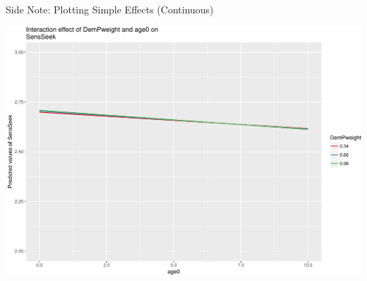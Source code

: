 \begin{frame}[fragile]{Side Note: Plotting Simple Effects (Continuous)}

\small

\begin{Shaded}
\begin{Highlighting}[]
 \NormalTok{, } \NormalTok{)}
\end{Highlighting}
\end{Shaded}

\includegraphics{Conditional_Models_files/figure-beamer/unnamed-chunk-29-1.pdf}

\normalsize  

\end{frame}


